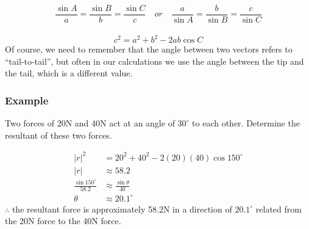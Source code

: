 \documentclass{article}
\begin{document}
 $$\frac{\sin A}{a}=\frac{\sin B}{b}=\frac{\sin C}{c} \quad or \quad \frac{a}{\sin A}=\frac{b}{\sin B}=\frac{c}{\sin C}$$\\

 $$c^2=a^2+b^2-2ab\cos C$$
 Of course, we need to remember that the angle between two vectors refers to “tail-to-tail”, but often in our calculations we use the angle between the tip and the tail, which is a different value.
 \subsubsection*{Example}
Two forces of 20N and 40N act at an angle of $30^{\circ}$ to each other.  Determine the resultant of these two forces.
\begin{center}
\end{center}

\begin{align*}
    |r|^2&=20^2+40^2-2(20)(40)\cos 150 ^{\circ}\\
    |r|&\approx 58.2\\
    \frac{\sin 150^{\circ}}{58.2}&\approx \frac{\sin \theta}{40}\\
    \theta &\approx 20.1^{\circ}
\end{align*}
$\therefore$ the resultant force is approximately 58.2N in a direction of $20.1^{\circ}$ related from the 20N force to the 40N force.\\
\newpage 
\end{document}
